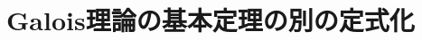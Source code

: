 \documentclass[../master_galois_theory]{subfiles}
\begin{document}
\setcounter{section}{12}

\section{Galois理論の基本定理の別の定式化}
\end{document}
